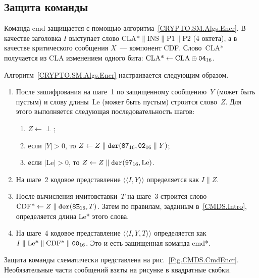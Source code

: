 \subsection{Защита команды}\label{CMDS.SM.EncrCmd}

Команда cmd защищается с помощью алгоритма~\ref{CRYPTO.SM.Algs.Encr}. 
%
В качестве заголовка $I$ выступает слово 
$\text{CLA*} \parallel \text{INS} \parallel \text{P1} \parallel \text{P2}$ 
(4 октета), а в качестве критического сообщения $X$~--- компонент CDF. 
%
Слово~CLA* получается из CLA изменением одного бита:
$\text{CLA*}\leftarrow\text{CLA}\oplus\texttt{04}_{16}$.

Алгоритм~\ref{CRYPTO.SM.Algs.Encr} настраивается следующим образом.
\begin{enumerate}
\item
После зашифрования на шаге~1 по защищенному сообщению~$Y$
(может быть пустым) и слову длины~Le (может быть пустым)
строится слово~$Z$. Для этого выполняется следующая 
последовательность шагов:
\begin{enumerate}
\item
$Z \gets\perp$;
\item
если $|Y|>0$, то $Z\gets Z\parallel\texttt{der}(\texttt{87}_{16},\texttt{02}_{16}\parallel Y)$;
\item
если $|\text{Le}|>0$, то $Z\gets Z\parallel\texttt{der}(\texttt{97}_{16}, \text{Le})$.
\end{enumerate}
\item
На шаге~2 кодовое представление $\langle\langle I,Y\rangle\rangle$
определяется как $I\parallel Z$.
\item
После вычисления имитовставки~$T$ на шаге~3 строится слово
$\text{CDF*}\gets Z\parallel \texttt{der}(\texttt{8E}_{16}, T)$.
Затем по правилам, заданным в~\ref{CMDS.Intro}, определяется длина Le* этого 
слова.
\item
На шаге~4 кодовое представление $\langle\langle I,Y,T\rangle\rangle$
определяется как $I\parallel\text{Le*}\parallel\text{CDF*}\parallel\texttt{00}_{16}$.
Это и есть защищенная команда cmd*.
\end{enumerate}

Защита команды схематически представлена на рис.~\ref{Fig.CMDS.CmdEncr}. 
Необязательные части сообщений взяты на рисунке в квадратные скобки.

